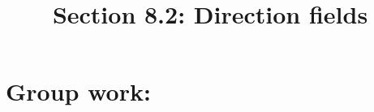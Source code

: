 \documentclass[noinstructornotes]{ximera}
\title{Section 8.2: Direction fields}
\begin{document}
\begin{abstract}		\end{abstract}
\maketitle

\section{Group work:}
\end{document}
